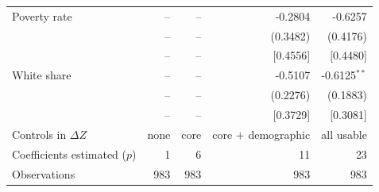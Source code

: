 \begin{tabular}{lrrrr}
Poverty rate & -- & -- & -0.2804 & -0.6257 \\
 & -- & -- & (0.3482) & (0.4176) \\
 & -- & -- & [0.4556] & [0.4480] \\
White share & -- & -- & -0.5107 & -0.6125$^{**}$ \\
 & -- & -- & (0.2276) & (0.1883) \\
 & -- & -- & [0.3729] & [0.3081] \\
\midrule
Controls in $\Delta Z$ & none & core & core $+$ demographic & all usable \\
Coefficients estimated ($p$) & 1 & 6 & 11 & 23 \\
Observations & 983 & 983 & 983 & 983 \\
\bottomrule
\end{tabular}
